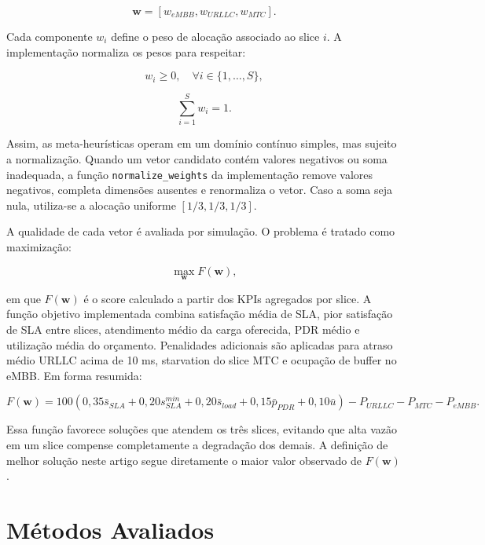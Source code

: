 \documentclass[12pt,a4paper]{article}
\begin{document}
\begin{equation}
\mathbf{w} = [w_{eMBB}, w_{URLLC}, w_{MTC}].
\end{equation}

Cada componente \(w_i\) define o peso de alocação associado ao slice \(i\). A implementação normaliza os pesos para respeitar:

\begin{equation}
w_i \geq 0, \quad \forall i \in \{1,\ldots,S\},
\end{equation}

\begin{equation}
\sum_{i=1}^{S} w_i = 1.
\end{equation}

Assim, as meta-heurísticas operam em um domínio contínuo simples, mas sujeito a normalização. Quando um vetor candidato contém valores negativos ou soma inadequada, a função \texttt{normalize\_weights} da implementação remove valores negativos, completa dimensões ausentes e renormaliza o vetor. Caso a soma seja nula, utiliza-se a alocação uniforme \([1/3, 1/3, 1/3]\).

A qualidade de cada vetor é avaliada por simulação. O problema é tratado como maximização:

\begin{equation}
\max_{\mathbf{w}} F(\mathbf{w}),
\end{equation}

em que \(F(\mathbf{w})\) é o score calculado a partir dos KPIs agregados por slice. A função objetivo implementada combina satisfação média de SLA, pior satisfação de SLA entre slices, atendimento médio da carga oferecida, PDR médio e utilização média do orçamento. Penalidades adicionais são aplicadas para atraso médio URLLC acima de 10 ms, starvation do slice MTC e ocupação de buffer no eMBB. Em forma resumida:

\begin{equation}
F(\mathbf{w}) = 100(0{,}35\bar{s}_{SLA} + 0{,}20s_{SLA}^{min} + 0{,}20\bar{s}_{load} + 0{,}15\bar{p}_{PDR} + 0{,}10\bar{u}) - P_{URLLC} - P_{MTC} - P_{eMBB}.
\end{equation}

Essa função favorece soluções que atendem os três slices, evitando que alta vazão em um slice compense completamente a degradação dos demais. A definição de melhor solução neste artigo segue diretamente o maior valor observado de \(F(\mathbf{w})\).

\section{Métodos Avaliados}
\end{document}
